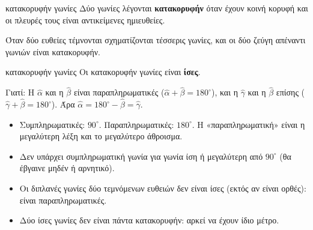 
\begin{orismos}{κατακορυφήν γωνίες}
Δύο γωνίες λέγονται \textbf{κατακορυφήν} όταν έχουν κοινή κορυφή και οι πλευρές τους είναι αντικείμενες ημιευθείες.
\end{orismos}

Όταν δύο ευθείες τέμνονται σχηματίζονται τέσσερις γωνίες, και οι δύο ζεύγη απέναντι γωνιών είναι κατακορυφήν.

\begin{center}
\end{center}

\begin{idiotita}{κατακορυφήν γωνίες}
Οι κατακορυφήν γωνίες είναι \textbf{ίσες}.
\end{idiotita}

Γιατί: Η $\hat{\alpha}$ και η $\hat{\beta}$ είναι παραπληρωματικές ($\hat{\alpha}+\hat{\beta}=180^\circ$), και η $\hat{\gamma}$ και η $\hat{\beta}$ επίσης ($\hat{\gamma}+\hat{\beta}=180^\circ$). Άρα $\hat{\alpha}=180^\circ-\hat{\beta}=\hat{\gamma}$.

\begin{prosoxi}
\begin{itemize}[leftmargin=1.2em,itemsep=0.3ex,topsep=2pt]
\item Συμπληρωματικές: $90^\circ$. Παραπληρωματικές: $180^\circ$. Η «παραπληρωματική» είναι η μεγαλύτερη λέξη και το μεγαλύτερο άθροισμα.
\item Δεν υπάρχει συμπληρωματική γωνία για γωνία ίση ή μεγαλύτερη από $90^\circ$ (θα έβγαινε μηδέν ή αρνητικό).
\item Οι διπλανές γωνίες δύο τεμνόμενων ευθειών δεν είναι ίσες (εκτός αν είναι ορθές): είναι παραπληρωματικές.
\item Δύο ίσες γωνίες δεν είναι πάντα κατακορυφήν: αρκεί να έχουν ίδιο μέτρο.
\end{itemize}
\end{prosoxi}


